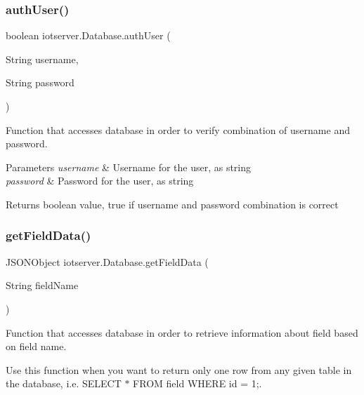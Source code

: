 \subsubsection{\texorpdfstring{auth\+User()}{authUser()}}
{\footnotesize\ttfamily boolean iotserver.\+Database.\+auth\+User (\begin{DoxyParamCaption}\item[{String}]{username,  }\item[{String}]{password }\end{DoxyParamCaption})\hspace{0.3cm}{\ttfamily [inline]}}

Function that accesses database in order to verify combination of username and password.


\begin{DoxyParams}{Parameters}
{\em username} & Username for the user, as string \\
\hline
{\em password} & Password for the user, as string \\
\hline
\end{DoxyParams}
\begin{DoxyReturn}{Returns}
boolean value, true if username and password combination is correct 
\end{DoxyReturn}
\mbox{\label{classiotserver_1_1Database_a2c12fba48ac94748e7ce8fb412b19c1e}} 
\subsubsection{\texorpdfstring{get\+Field\+Data()}{getFieldData()}\hspace{0.1cm}{\footnotesize\ttfamily [1/3]}}
{\footnotesize\ttfamily J\+S\+O\+N\+Object iotserver.\+Database.\+get\+Field\+Data (\begin{DoxyParamCaption}\item[{String}]{field\+Name }\end{DoxyParamCaption})\hspace{0.3cm}{\ttfamily [inline]}}

Function that accesses database in order to retrieve information about field based on field name.

Use this function when you want to return only one row from any given table in the database, i.\+e. S\+E\+L\+E\+CT $\ast$ F\+R\+OM field W\+H\+E\+RE id = 1;.


